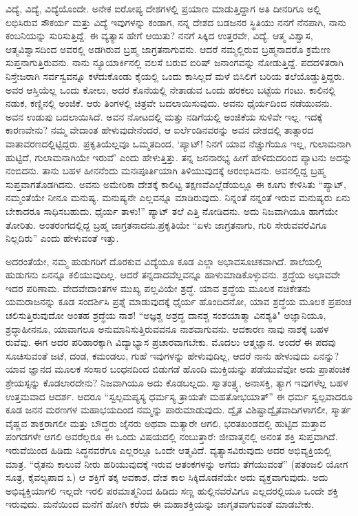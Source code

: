 ವಿದ್ಯೆ, ವಿದ್ಯೆ, ವಿದ್ಯೆಯೊಂದೇ. ಅನೇಕ ಐರೋಪ್ಯ ದೇಶಗಳಲ್ಲಿ ಪ್ರಯಾಣ ಮಾಡು\break ತ್ತಿದ್ದಾಗ ಅತಿ ದೀನರಿಗೂ ಅಲ್ಲಿ ಲಭಿಸಿರುವ ಸೌಕರ್ಯ ಮತ್ತು ವಿದ್ಯೆ ಇವುಗಳನ್ನು ಕಂಡಾಗ, ನನ್ನ ದೇಶದ ಬಡಜನರ ಸ್ಥಿತಿಯು ನನಗೆ ನೆನಪಾಗಿ, ನಾನು ಕಂಬನಿಯನ್ನು ಸುರಿಸುತ್ತಿದ್ದೆ. ಈ ವ್ಯತ್ಯಾಸ ಹೇಗೆ ಆಯಿತು? ನನಗೆ ಸಿಕ್ಕಿದ ಉತ್ತರವೇ, ವಿದ್ಯೆ. ಆತ್ಮ ವಿಶ್ವಾಸ, ಆತ್ಮವಿಶ್ವಾಸದಿಂದ ಅವರಲ್ಲಿ ಅಡಗಿರುವ ಬ್ರಹ್ಮ ಜಾಗ್ರತನಾಗುವನು. ಆದರೆ ನಮ್ಮಲ್ಲಿರುವ ಬ್ರಹ್ಮನಾದರೊ ಕ್ರಮೇಣ ಸುಪ್ತನಾಗುತ್ತಿರುವನು. ನಾನು ನ್ಯೂಯಾರ್ಕಿನಲ್ಲಿ ವಲಸೆ ಬರುವ ಐರಿಷ್ ಜನಾಂಗವನ್ನು ನೋಡುತ್ತಿದ್ದೆ. ಪದದಳಿತರಾಗಿ ನಿಸ್ತೇಜರಾಗಿ ಸರ್ವಸ್ವವನ್ನೂ ಕಳೆದುಕೊಂಡು ಕೈಯಲ್ಲಿ ಒಂದು ಕಾಸಿಲ್ಲದೆ ಮಳೆ ಬಿಸಿಲಿಗೆ ಬರಿಯ ತಲೆಯೊಡ್ಡುತ್ತಿದ್ದರು. ಅವರ ಆಸ್ತಿಯೆಲ್ಲ ಒಂದು ಕೋಲು, ಅದರ ಕೊನೆಯಲ್ಲಿ ನೇತಾಡುವ ಒಂದು ಹರಕಲು ಬಟ್ಟೆಯ ಗಂಟು. ಕಾಲಿನಲ್ಲಿ ನಡುಕ, ಕಣ್ಣಿನಲ್ಲಿ ಅಂಜಿಕೆ. ಆರು ತಿಂಗಳಲ್ಲಿ ಚಿತ್ರವೇ ಬದಲಾಯಿಸುವುದು. ಅವನು ಧೈರ್ಯದಿಂದ ನಡೆಯುವನು. ಅವನ ಉಡುಪು ಬದಲಾಯಿಸಿದೆ. ಅವನ ನೋಟದಲ್ಲಿ ಮತ್ತು ನಡಿಗೆಯಲ್ಲಿ ಅಂಜಿಕೆಯ ಸುಳಿವೇ ಇಲ್ಲ. ಇದಕ್ಕೆ ಕಾರಣವೇನು? ನಮ್ಮ ವೇದಾಂತ ಹೇಳುವುದೇನೆಂದರೆ, ಆ ಐರ್ಲೆಂಡಿನವರನ್ನು ಅವನ ದೇಶದಲ್ಲಿ ತಾತ್ಸಾರದ ವಾತಾವರಣದಲ್ಲಿಟ್ಟಿದ್ದರು. ಪ್ರಕೃತಿಯೆಲ್ಲವೂ ಒಮ್ಮತದಿಂದ, `ಪ್ಯಾಟ್! ನಿನಗೆ ಯಾವ ನೆಚ್ಚುಗೆಯೂ ಇಲ್ಲ, ಗುಲಾಮನಾಗಿ ಹುಟ್ಟಿದೆ, ಗುಲಾಮನಾಗಿಯೇ ಇರುವೆ' ಎಂದು ಹೇಳುತ್ತಿತ್ತು. ತನ್ನ ಜನನಾರಭ್ಯ ಹೀಗೆ ಹೇಳಿದುದರಿಂದ ಪ್ಯಾಟನು ಅದನ್ನು ನಂಬಿದನು. ತಾನು ಬಹಳ ಹೀನನೆಂದು ಮನಃಪೂರ್ತಿಯಾಗಿ ತಿಳಿಯುವುದಕ್ಕೆ ಆರಂಭಿಸಿದನು. ಅವನಲ್ಲಿದ್ದ ಬ್ರಹ್ಮ ಸುಪ್ತವಾಗತೊಡಗಿದನು. ಅವನು ಅಮೇರಿಕಾ ದೇಶಕ್ಕೆ ಕಾಲಿಟ್ಟ ತಕ್ಷಣವೆ\break ಎಲ್ಲೆಡೆಯಲ್ಲೂ ಈ ಕೂಗು ಕೇಳಿಸಿತು\enginline{-} “ಪ್ಯಾಟ್, ನಮ್ಮಂತೆಯೇ ನೀನೂ ಮನುಷ್ಯ. ಮನುಷ್ಯನೇ ಎಲ್ಲವನ್ನೂ ಮಾಡಿರುವುದು. ನಿನ್ನಂತೆ ನನ್ನಂತೆ ಇರುವ ಮನುಷ್ಯರು ಏನು ಬೇಕಾದರೂ ಸಾಧಿಸಬಹುದು. ಧೈರ್ಯ ತಾಳು!” ಪ್ಯಾಟ್ ತಲೆ ಎತ್ತಿ ನೋಡಿದನು. ಅದು ನಿಜವಾಗಿಯೂ ಹಾಗೆಯೇ ತೋರಿತು. ಅಂತರಂಗದಲ್ಲಿದ್ದ ಬ್ರಹ್ಮ ಜಾಗ್ರತನಾದನು.\break ಪ್ರಕೃತಿಯೇ “ಏಳು ಜಾಗ್ರತನಾಗು, ಗುರಿ ಸೇರುವವರೆವಿಗೂ ನಿಲ್ಲದಿರು” ಎಂದು ಹೇಳುವಂತೆ ಇತ್ತು.

ಅದರಂತೆಯೇ, ನಮ್ಮ ಹುಡುಗರಿಗೆ ದೊರಕುವ ವಿದ್ಯೆಯೂ ಕೂಡ ಎಲ್ಲಾ ಅಭಾವಸೂಚಕವಾಗಿದೆ. ಶಾಲೆಯಲ್ಲಿ ಹುಡುಗನು ಏನನ್ನೂ ಕಲಿಯುವುದಿಲ್ಲ. ಆದರೆ ತನ್ನದಾದವೆಲ್ಲವನ್ನೂ ಹಾಳುಮಾಡಿಕೊಳ್ಳುವನು. ಶ್ರದ್ಧೆಯ ಅಭಾವವೇ ಇದರ ಪರಿಣಾಮ. ವೇದವೇದಾಂತಗಳ ಮುಖ್ಯ ಪಲ್ಲವಿಯೇ ಶ್ರದ್ಧೆ. ಯಾವ ಶ್ರದ್ಧೆಯ ಮೂಲಕ ನಚಿಕೇತನು ಯಮರಾಜನನ್ನು ಕೂಡ ಸಂದರ್ಶಿಸಿ ಪ್ರಶ್ನೆ ಮಾಡುವುದಕ್ಕೆ ಧೈರ್ಯ ಹೊಂದಿದನೋ, ಯಾವ ಶ್ರದ್ಧೆಯ ಮೂಲಕ ಪ್ರಪಂಚ ಚಲಿಸುತ್ತಿರುವುದೋ\enginline{-} ಅಂತಹ ಶ್ರದ್ಧೆಯ ನಾಶ! “ಅಜ್ಞಶ್ಚ ಅಶ್ರದ್ಧ ದಾನಶ್ಚ ಸಂಶಯಾತ್ಮಾ ವಿನಶ್ಯತಿ"\enginline{-} ಅಜ್ಞಾನಿಯೂ, ಶ್ರದ್ಧಾಹೀನನೂ, ಯಾವಾಗಲೂ ಅನುಮಾನಿಸುತ್ತಿರುವವನೂ ನಾಶವಾಗುವನು. ಆದಕಾರಣ ನಾವು ನಾಶಕ್ಕೆ ಬಹಳ ರುವೆವು. ಈಗ ಅದರ ಪರಿಹಾರಕ್ಕಾಗಿ ವಿದ್ಯಾಭ್ಯಾಸ ಪ್ರಚಾರವಾಗಬೇಕು. ಮೊದಲು ಆತ್ಮಜ್ಞಾನ. ಅಂದರೆ ಈ ಪದವು ಸೂಚಿಸುವಂತೆ ಜಟೆ, ದಂಡ, ಕಮಂಡಲು, ಗುಹೆ ಇವುಗಳನ್ನು ಹೇಳುವುದಿಲ್ಲ, ಆದರೆ ನಾನು ಹೇಳುವುದು ಏನನ್ನು? ಯಾವ ಜ್ಞಾನದ ಮೂಲಕ ಸಂಸಾರ ಬಂಧನದಿಂದ ಬಿಡುಗಡೆ ಹೊಂದಿ ಮುಕ್ತಿಯನ್ನು ಪಡೆಯುವೆವೋ ಅದು ಪ್ರಾಪಂಚಿಕ ಶ್ರೇಯಸ್ಸನ್ನು ಕೊಡಲಾರದೇನು? ನಿಜವಾಗಿಯೂ ಅದು ಕೊಡಬಲ್ಲದು. ಸ್ವಾತಂತ್ರ್ಯ, ಅನಾಸಕ್ತಿ, ತ್ಯಾಗ\enginline{-} ಇವುಗಳೆಲ್ಲ ಬಹಳ ಉತ್ತಮವಾದ ಆದರ್ಶ. ಆದರೂ “ಸ್ವಲ್ಪಮಪ್ಯಸ್ಯ ಧರ್ಮಸ್ಯ ತ್ರಾಯತೇ ಮಹತೋಭಯಾತ್”\enginline{-} ಈ ಧರ್ಮ ಸ್ವಲ್ಪವಾದರೂ ಕೂಡ ಜನನ ಮರಣಗಳ ಮಹಾಭಯದಿಂದ ನಮ್ಮನ್ನು ಪಾರುಮಾಡುವುದು. ದ್ವೈತ ವಿಶಿಷ್ಟಾದ್ವೈತವಾದಿಗಳಾಗಲೀ, ಸ್ಮಾರ್ತ\enginline{-} ವೈಷ್ಣವ\enginline{-} ಶಾಕ್ತರಾಗಲೀ ಮತ್ತು ಬೌದ್ಧರು ಜೈನರು ಅಥವಾ ಮತ್ಯಾರೇ ಆಗಲಿ, ಭರತಖಂಡದಲ್ಲಿ ಹುಟ್ಟಿದ ಮತ್ತಾವ ಪಂಗಡಗಳೇ ಆಗಲಿ ಅವರೆಲ್ಲರೂ ಈ ಒಂದು ವಿಷಯದಲ್ಲಿ ನಂಬುತ್ತಾರೆ: ಜೀವಾತ್ಮನಲ್ಲಿ ಅನಂತ ಶಕ್ತಿ ಸುಪ್ತವಾಗಿದೆ. ಇರುವೆಯಿಂದ ಹಿಡಿದು ಸಿದ್ಧನವರೆಗೂ ಎಲ್ಲರಲ್ಲೂ ಒಂದೇ ಆತ್ಮವಿದೆ. ವ್ಯತ್ಯಾಸವಿರುವುದು ಅದರ ಅಭಿವ್ಯಕ್ತಿಯಲ್ಲಿ ಮಾತ್ರ. “ರೈತನು ಕಾಲುವೆ ನೀರು ಹರಿಯುವುದಕ್ಕೆ ಇರುವ ಆತಂಕಗಳನ್ನು ಅಗೆದು ತೆಗೆಯುವಂತೆ” (ಪತಂಜಲಿ ಯೋಗ ಸೂತ್ರ, ಕೈವಲ್ಯಪಾದ ೩)\enginline{-} ಆ ಶಕ್ತಿಗೆ ತಕ್ಕ ಅವಕಾಶ, ದೇಶ ಕಾಲ ಸಿಕ್ಕಿದೊಡನೆಯೇ ಅದು ವ್ಯಕ್ತವಾಗುವುದು. ಅದು ಅಭಿವ್ಯಕ್ತಿಯಾಗಲಿ ಇಲ್ಲದೇ ಇರಲಿ ಪರಮಾತ್ಮನಿಂದ ಹಿಡಿದು ಸಣ್ಣ ಹುಲ್ಲಿನವರೆವಿಗೂ ಎಲ್ಲದರಲ್ಲಿಯೂ ಒಂದೇ ಶಕ್ತಿ ಇರುವುದು. ಮನೆಯಿಂದ ಮನೆಗೆ ಹೋಗಿ ಕರೆದು ಈ ಮಹಾಶಕ್ತಿಯನ್ನು ಜಾಗೃತವಾಗುವಂತೆ ಮಾಡಬೇಕು.

